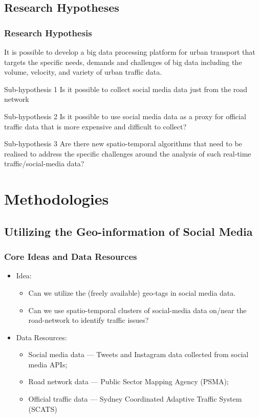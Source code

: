 \subsection{Research Hypotheses}

\begin{frame}
    \frametitle{Research Hypothesis}
    \small
    It is possible to develop a big data processing platform for urban transport that targets the specific needs, demands and challenges of big data including the volume, velocity, and variety of urban traffic data.
    \begin{block}{Sub-hypothesis 1} \small
    Is it possible to collect social media data just from the road network
    \end{block}
    \begin{block}{Sub-hypothesis 2} \small
    Is it possible to use social media data as a proxy for official traffic data that is more expensive and difficult to collect?
    \end{block}
    \begin{block}{Sub-hypothesis 3} \small
    Are there new spatio-temporal algorithms that need to be realised to address the specific challenges around the analysis of such real-time traffic/social-media data?
    \end{block}
\end{frame}

\section{Methodologies}

\subsection{Utilizing the Geo-information of Social Media}
\begin{frame}
    \frametitle{Core Ideas and Data Resources}
    \begin{itemize}
	    \item Idea:
	    \begin{itemize}
	        \item Can we utilize the (freely available) geo-tags in social media data.
	        \item Can we use spatio-temporal clusters of social-media data on/near the road-network to identify traffic issues?
	    \end{itemize}
	    \item Data Resources:
	    \begin{itemize}
	        \item Social media data --- Tweets and Instagram data collected from social media APIs;
	        \item Road network data --- Public Sector Mapping Agency (PSMA); 
	        \item Official traffic data --- Sydney Coordinated Adaptive Traffic System (SCATS)
	    \end{itemize}
    \end{itemize}
\end{frame}

